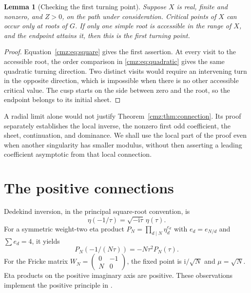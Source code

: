 \documentclass[11pt,letterpaper]{article}
\numberwithin{equation}{section}
\newtheorem{lemma}[theorem]{Lemma}
\theoremstyle{definition}\newtheorem{definition}[theorem]{Definition}
\theoremstyle{remark}\newtheorem{remark}[theorem]{Remark}
\newcommand{\ii}{\mathrm i}
\begin{document}
\begin{lemma}[Checking the first turning point]
\label{cmz:lem:turn}
Suppose $X$ is real, finite and nonzero, and $Z>0$, on the path under consideration. Critical points of $X$ can occur only at roots of $G$. If only one simple root is accessible in the range of $X$, and the endpoint attains it, then this is the first turning point.
\end{lemma}
\begin{proof}
Equation~\eqref{cmz:eq:square} gives the first assertion. At every visit to the accessible root, the order comparison in \eqref{cmz:eq:quadratic} gives the same quadratic turning direction. Two distinct visits would require an intervening turn in the opposite direction, which is impossible when there is no other accessible critical value. The cusp starts on the side between zero and the root, so the endpoint belongs to its initial sheet.
\end{proof}

A radial limit alone would not justify Theorem~\ref{cmz:thm:connection}. Its proof separately establishes the local inverse, the nonzero first odd coefficient, the sheet, continuation, and dominance. We shall use the local part of the proof even when another singularity has smaller modulus, without then asserting a leading coefficient asymptotic from that local connection.

\section{The positive connections}
\label{cmz:sec:positive}
Dedekind inversion, in the principal square-root convention, is
\[
\eta(-1/\tau)=\sqrt{-\ii\tau}\,\eta(\tau).
\]
For a symmetric weight-two eta product $P_N=\prod_{d\mid N}\eta_d^{e_d}$ with $e_d=e_{N/d}$ and $\sum e_d=4$, it yields
\begin{equation}
P_N(-1/(N\tau))=-N\tau^2P_N(\tau).
\label{cmz:eq:etaFricke}
\end{equation}
For the Fricke matrix $W_N=\left(\begin{smallmatrix}0&-1\\N&0\end{smallmatrix}\right)$, the fixed point is $\ii/\sqrt N$ and $\mu=\sqrt N$. Eta products on the positive imaginary axis are positive. These observations implement the positive principle in \cite[(27)]{GZ}.
\end{document}
